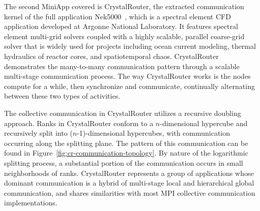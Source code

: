 
The second MiniApp covered is CrystalRouter, 
the extracted communication kernel of the full application Nek5000~\cite{nek5000}, 
which is a spectral element CFD application developed at Argonne National Laboratory. 
It features spectral element multi-grid solvers coupled with a highly scalable, 
parallel coarse-grid solver that is widely used for projects including ocean current modeling, 
thermal hydraulics of reactor cores, and spatiotemporal chaos. 
CrystalRouter demonstrates the many-to-many communication pattern 
through a scalable multi-stage communication process. 
The way CrystalRouter works is the nodes compute for a while, 
then synchronize and communicate, continually alternating between these two types of activities.

The collective communication in CrystalRouter utilizes a recursive doubling approach. 
Ranks in CrystalRouter conform to a $n$-dimensional hypercube 
and recursively split into ($n$-1)-dimensional hypercubes, 
with communication occurring along the splitting plane. 
The pattern of this communication can be found in Figure~\ref{fig:cr-communication-topology}. 
By nature of the logarithmic splitting process, 
a substantial portion of the communication occurs in small neighborhoods of ranks. 
CrystalRouter represents a group of applications whose dominant communication 
is a hybrid of multi-stage local and hierarchical global communication, 
and shares similarities with most MPI collective communication implementations.


